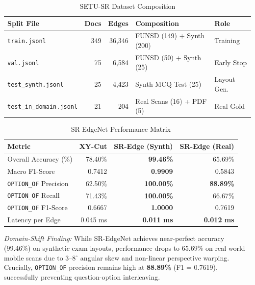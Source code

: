 \documentclass[conference]{IEEEtran}
\begin{document}
\begin{table}[htbp]
\caption{SETU-SR Dataset Composition}
\begin{center}
\begin{tabular}{lrrll}
\toprule
\textbf{Split File} & \textbf{Docs} & \textbf{Edges} & \textbf{Composition} & \textbf{Role} \\
\midrule
\texttt{train.jsonl} & 349 & 36,346 & FUNSD (149) + Synth (200) & Training \\
\texttt{val.jsonl} & 75 & 6,584 & FUNSD (50) + Synth (25) & Early Stop \\
\texttt{test\_synth.jsonl} & 25 & 4,423 & Synth MCQ Test (25) & Layout Gen. \\
\texttt{test\_in\_domain.jsonl} & 21 & 204 & Real Scans (16) + PDF (5) & Real Gold \\
\bottomrule
\end{tabular}
\end{center}
\end{table}

\begin{table}[htbp]
\caption{SR-EdgeNet Performance Matrix}
\begin{center}
\begin{tabular}{lrrr}
\toprule
\textbf{Metric} & \textbf{XY-Cut} & \textbf{SR-Edge (Synth)} & \textbf{SR-Edge (Real)} \\
\midrule
Overall Accuracy (\%) & 78.40\% & \textbf{99.46\%} & 65.69\% \\
Macro F1-Score & 0.7412 & \textbf{0.9909} & 0.5843 \\
\texttt{OPTION\_OF} Precision & 62.50\% & \textbf{100.00\%} & \textbf{88.89\%} \\
\texttt{OPTION\_OF} Recall & 71.43\% & \textbf{100.00\%} & 66.67\% \\
\texttt{OPTION\_OF} F1-Score & 0.6667 & \textbf{1.0000} & 0.7619 \\
Latency per Edge & 0.045 ms & \textbf{0.011 ms} & \textbf{0.012 ms} \\
\bottomrule
\end{tabular}
\end{center}
\end{table}

\textit{Domain-Shift Finding:} While SR-EdgeNet achieves near-perfect accuracy (99.46\%) on synthetic exam layouts, performance drops to 65.69\% on real-world mobile scans due to 3--8$^\circ$ angular skew and non-linear perspective warping. Crucially, \texttt{OPTION\_OF} precision remains high at \textbf{88.89\%} (F1 = 0.7619), successfully preventing question-option interleaving.
\end{document}
